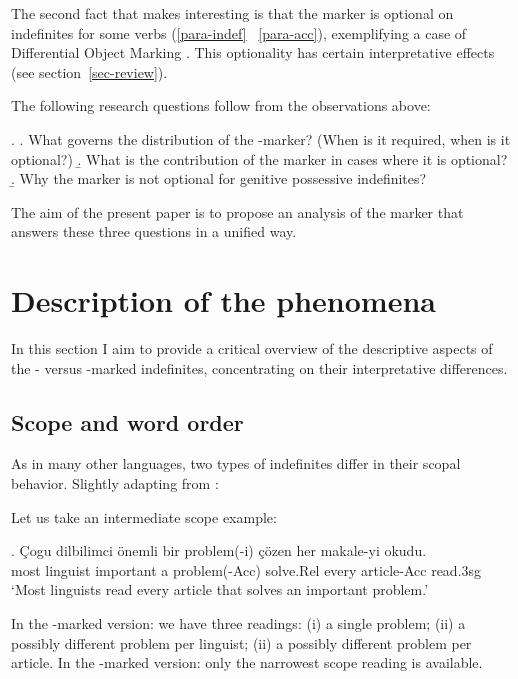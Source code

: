 \documentclass[11pt,a4paper]{article}
\begin{document}
The second fact that makes  interesting is that the marker is
optional on indefinites for some verbs (\ref{para-indef} \versus\
\ref{para-acc}), exemplifying a case of Differential Object Marking
\cttxp{aissen03}. This optionality has certain interpretative effects (see
section~\ref{sec-review}).

The following research questions follow from the observations above:

\ex.\label{res-ques}
\a.\label{res-ques-syn} What governs the distribution of the \acc-marker? (When
is it required, when is it optional?)
\b.\label{res-ques-sem} What is the contribution of the marker in cases where it is optional?
\b.\label{res-ques-genposs} Why the marker is not optional for genitive possessive indefinites?


The aim of the present paper is to propose an analysis of the marker that
answers these three questions in a unified way.

\section{Description of the phenomena}

In this section I aim to provide a critical overview of the descriptive aspects of the \acc- versus \zero-marked indefinites, concentrating on their interpretative differences.


\subsection{Scope and word order}
\label{scscope}

As in many other languages, two types of indefinites differ in their scopal behavior. Slightly adapting from :

Let us take an intermediate scope example:

\exg. Çogu dilbilimci önemli bir problem(-i) çözen her makale-yi okudu.\\
most linguist important a problem(-Acc) solve.Rel every article-Acc read.3sg\\
`Most linguists read every article that solves an important problem.'

In the \acc-marked version: we have three readings: (i) a single problem; (ii) a possibly different problem per linguist; (ii) a possibly different problem per article. In the \zero-marked version: only the narrowest scope reading is available.
\end{document}
